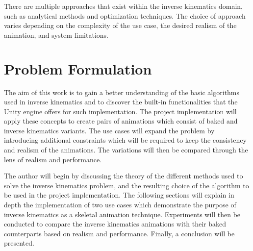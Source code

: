 There are multiple approaches that exist within the inverse kinematics domain,
such as analytical methods and optimization techniques. The choice of approach
varies depending on the complexity of the use case, the desired realism of the
animation, and system limitations.

\section{Problem Formulation}

The aim of this work is to gain a better understanding of the basic algorithms
used in inverse kinematics and to discover the built-in functionalities that the
Unity engine offers for such implementation. The project implementation will
apply these concepts to create pairs of animations which consist of baked and
inverse kinematics variants. The use cases will expand the problem by
introducing additional constraints which will be required to keep the
consistency and realism of the animations. The variations will then be compared
through the lens of realism and performance.

The author will begin by discussing the theory of the different methods used to
solve the inverse kinematics problem, and the resulting choice of the algorithm
to be used in the project implementation. The following sections will explain in
depth the implementation of two use cases which demonstrate the purpose of
inverse kinematics as a skeletal animation technique. Experiments will then be
conducted to compare the inverse kinematics animations with their baked
counterparts based on realism and performance. Finally, a conclusion will be
presented.
